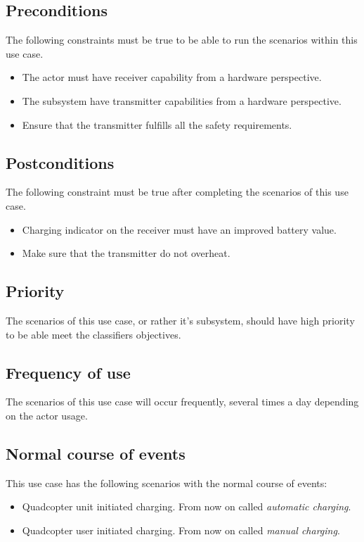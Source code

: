 \documentclass[a4paper]{article}
\begin{document}
\subsection{Preconditions}
The following constraints must be true to be able to run the scenarios within this use case.
\begin{itemize}
	\item The actor must have receiver capability from a hardware perspective.
	\item The subsystem have transmitter capabilities from a hardware perspective.
	\item Ensure that the transmitter fulfills all the safety requirements.
\end{itemize}
\subsection{Postconditions}
The following constraint must be true after completing the scenarios of this use case.
\begin{itemize}
	\item Charging indicator on the receiver must have an improved battery value.
	\item Make sure that the transmitter do not overheat.
\end{itemize}
\subsection{Priority}
The scenarios of this use case, or rather it's subsystem, should have high priority to be able meet the classifiers objectives.
\subsection{Frequency of use}
The scenarios of this use case will occur frequently, several times a day depending on the actor usage.
\subsection{Normal course of events}
This use case has the following scenarios with the normal course of events:
\begin{itemize}
	\item Quadcopter unit initiated charging. From now on called \textit{automatic charging}.
	\item Quadcopter user initiated charging. From now on called \textit{manual charging}.
\end{itemize}
\end{document}
